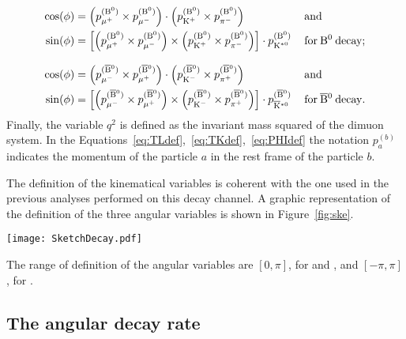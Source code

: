\begin{equation} \label{eq:PHIdef}
  \begin{aligned}
    \cos(\phi) &= \left( p_{\mu^{+}}^{({\textrm{B}}{}^{0})} \times p_{\mu^{-}}^{({\textrm{B}}{}^{0})} \right) \cdot \left( p_{\textrm{K}^{+}}^{({\textrm{B}}{}^{0})} \times p_{\pi^{-}}^{({\textrm{B}}{}^{0})} \right) \, && \mathrm{and} \\
    \sin(\phi) &= \left[ \left( p_{\mu^{+}}^{({\textrm{B}}{}^{0})} \times p_{\mu^{-}}^{({\textrm{B}}{}^{0})} \right) \times \left( p_{\textrm{K}^{+}}^{({\textrm{B}}{}^{0})} \times p_{\pi^{-}}^{({\textrm{B}}{}^{0})} \right) \right] \cdot p_{\textrm{K}^{\ast0}}^{({\textrm{B}}{}^{0})}\, && \mathrm{for}\:{\textrm{B}}{}^{0}\:\mathrm{decay;} \\[8pt]
    \cos(\phi) &= \left( p_{\mu^{-}}^{(\overline{\textrm{B}}{}^{0})} \times p_{\mu^{+}}^{(\overline{\textrm{B}}{}^{0})} \right) \cdot \left( p_{\textrm{K}^{-}}^{(\overline{\textrm{B}}{}^{0})} \times p_{\pi^{+}}^{(\overline{\textrm{B}}{}^{0})} \right) \, && \mathrm{and} \\
    \sin(\phi) &= \left[ \left( p_{\mu^{-}}^{(\overline{\textrm{B}}{}^{0})} \times p_{\mu^{+}}^{(\overline{\textrm{B}}{}^{0})} \right) \times \left( p_{\textrm{K}^{-}}^{(\overline{\textrm{B}}{}^{0})} \times p_{\pi^{+}}^{(\overline{\textrm{B}}{}^{0})} \right) \right] \cdot p_{\overline{\textrm{K}}{}^{\ast0}}^{(\overline{\textrm{B}}{}^{0})}\, && \mathrm{for}\:\overline{\textrm{B}}{}^{0}\:\mathrm{decay.} \\
  \end{aligned}
\end{equation}
Finally, the variable $q^2$ is defined as the invariant mass squared of the dimuon system.
In the Equations~\ref{eq:TLdef},~\ref{eq:TKdef},~\ref{eq:PHIdef} the notation $p_a^{(b)}$ indicates the momentum of the particle $a$ in the rest frame of the particle $b$.

The definition of the kinematical variables is coherent with the one used in the previous analyses performed on this decay channel.
A graphic representation of the definition of the three angular variables is shown in Figure~\ref{fig:ske}.

\begin{figure*}[!tbh]
  \begin{center}
    \texttt{[image: SketchDecay.pdf]}
    \caption{Illustration of the angular variables \TL (left), \TK (middle), and \PHI (right) for the decay \BtoKstmumudecay.}
    \label{fig:ske}
  \end{center}
\end{figure*}

The range of definition of the angular variables are $\left[0,\pi\right]$, for \TL and \TK, and $\left[-\pi,\pi\right]$, for \PHI.


\subsection{The angular decay rate}
\label{sec:decRate}

